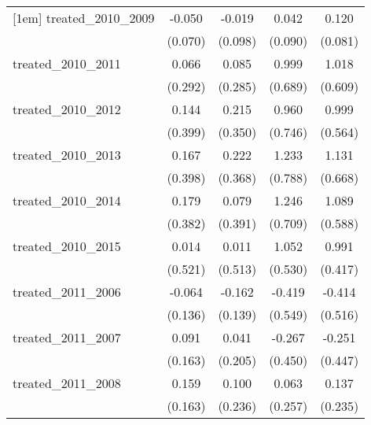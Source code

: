 {\begin{tabular}{l*{4}{c}}
[1em]
treated\_2010\_2009&      -0.050         &      -0.019         &       0.042         &       0.120         \\
            &     (0.070)         &     (0.098)         &     (0.090)         &     (0.081)         \\
[1em]
treated\_2010\_2011&       0.066         &       0.085         &       0.999         &       1.018         \\
            &     (0.292)         &     (0.285)         &     (0.689)         &     (0.609)         \\
[1em]
treated\_2010\_2012&       0.144         &       0.215         &       0.960         &       0.999         \\
            &     (0.399)         &     (0.350)         &     (0.746)         &     (0.564)         \\
[1em]
treated\_2010\_2013&       0.167         &       0.222         &       1.233         &       1.131         \\
            &     (0.398)         &     (0.368)         &     (0.788)         &     (0.668)         \\
[1em]
treated\_2010\_2014&       0.179         &       0.079         &       1.246         &       1.089         \\
            &     (0.382)         &     (0.391)         &     (0.709)         &     (0.588)         \\
[1em]
treated\_2010\_2015&       0.014         &       0.011         &       1.052\sym{*}  &       0.991\sym{*}  \\
            &     (0.521)         &     (0.513)         &     (0.530)         &     (0.417)         \\
[1em]
treated\_2011\_2006&      -0.064         &      -0.162         &      -0.419         &      -0.414         \\
            &     (0.136)         &     (0.139)         &     (0.549)         &     (0.516)         \\
[1em]
treated\_2011\_2007&       0.091         &       0.041         &      -0.267         &      -0.251         \\
            &     (0.163)         &     (0.205)         &     (0.450)         &     (0.447)         \\
[1em]
treated\_2011\_2008&       0.159         &       0.100         &       0.063         &       0.137         \\
            &     (0.163)         &     (0.236)         &     (0.257)         &     (0.235)         \\

\end{tabular}}
